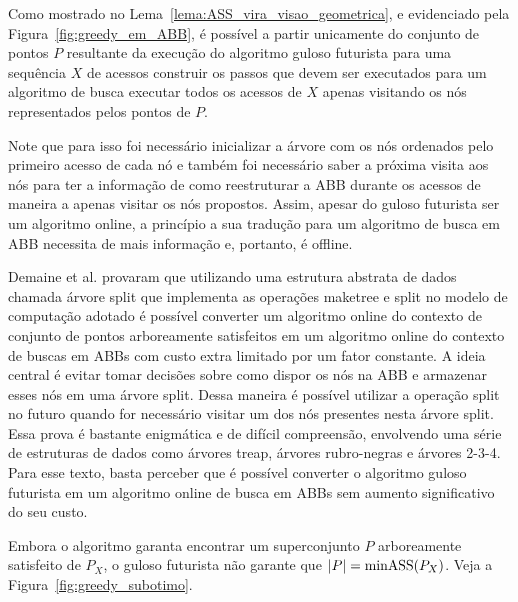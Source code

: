 Como mostrado no Lema~\ref{lema:ASS_vira_visao_geometrica}, e evidenciado pela Figura~\ref{fig:greedy_em_ABB}, é possível a partir unicamente do conjunto de pontos $P$ resultante da execução do algoritmo guloso futurista para uma sequência $X$ de acessos construir os passos que devem ser executados para um algoritmo de busca executar todos os acessos de $X$ apenas visitando os nós representados pelos pontos de $P$. 

Note que para isso foi necessário inicializar a árvore com os nós ordenados pelo primeiro acesso de cada nó e também foi necessário saber a próxima visita aos nós para ter a informação de como reestruturar a ABB durante os acessos de maneira a apenas visitar os nós propostos. Assim, apesar do guloso futurista ser um algoritmo online, a princípio a sua tradução para um algoritmo de busca em ABB necessita de mais informação e, portanto, é offline.

Demaine et al. \cite{geometry_of_bst} provaram que utilizando uma estrutura abstrata de dados chamada árvore split que implementa as operações maketree e split no modelo de computação adotado é possível converter um algoritmo online do contexto de conjunto de pontos arboreamente satisfeitos em um algoritmo online do contexto de buscas em ABBs com custo extra limitado por um fator constante. A ideia central é evitar tomar decisões sobre como dispor os nós na ABB e armazenar esses nós em uma árvore split. Dessa maneira é possível utilizar a operação split no futuro quando for necessário visitar um dos nós presentes nesta árvore split. Essa prova é bastante enigmática e de difícil compreensão, envolvendo uma série de estruturas de dados como árvores treap, árvores rubro-negras e árvores 2-3-4. Para esse texto, basta perceber que é possível converter o algoritmo guloso futurista em um algoritmo online de busca em ABBs sem aumento significativo do seu custo.

Embora o algoritmo garanta encontrar um superconjunto $P$ arboreamente satisfeito de $P_X$, o guloso futurista não garante que $|P| = \mathrm{minASS}(P_X)$. Veja a Figura~\ref{fig:greedy_subotimo}.

